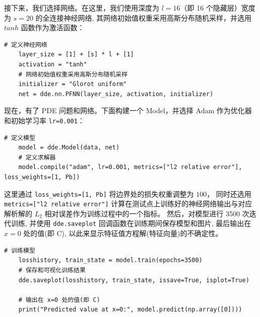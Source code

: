 \documentclass{Sichuan Normal University}
\begin{document}
接下来，我们选择网络。在这里，我们使用深度为 $l=16$（即 16 个隐藏层）宽度为 $s=20$ 的全连接神经网络, 其网络初始值权重采用高斯分布随机采样，并选用 $tanh$ 函数作为激活函数：
\begin{lstlisting}[style=python,basicstyle=\footnotesize\fontspec{Courier New},]  
    # 定义神经网络
    layer_size = [1] + [s] * l + [1]
    activation = "tanh"
    # 网络初始值权重采用高斯分布随机采样
    initializer = "Glorot uniform"
    net = dde.nn.PFNN(layer_size, activation, initializer)
\end{lstlisting}
现在，有了 PDE 问题和网络。下面构建一个 Model，并选择 Adam 作为优化器和初始学习率 \texttt{lr=0.001}：
\begin{lstlisting}[style=python,basicstyle=\footnotesize\fontspec{Courier New},]  
    # 定义模型
    model = dde.Model(data, net)
    # 定义求解器
    model.compile("adam", lr=0.001, metrics=["l2 relative error"], loss_weights=[1, Pb])
\end{lstlisting}
这里通过 \texttt{loss\_weights=[1, Pb]} 将边界处的损失权重调整为 $100$， 同时还选用 \texttt{metrics=["l2 relative error"]} 计算在测试点上训练好的神经网络输出与对应解析解的 $L_2$ 相对误差作为训练过程中的一个指标。
然后，对模型进行 3500 次迭代训练, 并使用 \texttt{dde.saveplot} 回调函数在训练期间保存模型和图片, 最后输出在 $x=0$ 处的值(即 C), 以此来显示特征值方程解(特征向量)的不确定性。
\begin{lstlisting}[style=python,basicstyle=\footnotesize\fontspec{Courier New},]  
    # 训练模型
    losshistory, train_state = model.train(epochs=3500)
    # 保存和可视化训练结果
    dde.saveplot(losshistory, train_state, issave=True, isplot=True)

    # 输出在 x=0 处的值(即 C)
    print("Predicted value at x=0:", model.predict(np.array([0])))
\end{lstlisting}
\end{document}
